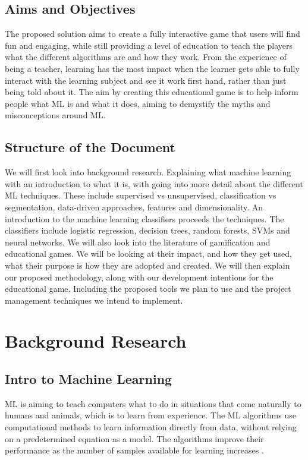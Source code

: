 \documentclass[a4paper,10pt]{article}
\begin{document}
\subsection{Aims and Objectives}
The proposed solution aims to create a fully interactive game that users will find fun and engaging, while still providing a level of education to teach the players what the different algorithms are and how they work. From the experience of being a teacher, learning has the most impact when the learner gets able to fully interact with the learning subject and see it work first hand, rather than just being told about it. The aim by creating this educational game is to help inform people what ML is and what it does, aiming to demystify the myths and misconceptions around ML.

\subsection{Structure of the Document}
We will first look into background research. Explaining what machine learning with an introduction to what it is, with going into more detail about the different ML techniques. These include supervised vs unsupervised, classification vs segmentation, data-driven approaches, features and dimensionality. An introduction to the machine learning classifiers proceeds the techniques. The classifiers include logistic regression, decision trees, random forests, SVMs and neural networks. We will also look into the literature of gamification and educational games. We will be looking at their impact, and how they get used, what their purpose is how they are adopted and created. We will then explain our proposed methodology, along with our development intentions for the educational game. Including the proposed tools we plan to use and the project management techniques we intend to implement.

\section{Background Research}
\subsection{Intro to Machine Learning}
ML is aiming to teach computers what to do in situations that come naturally to humans and animals, which is to learn from experience. The ML algorithms use computational methods to learn information directly from data, without relying on a predetermined equation as a model. The algorithms improve their performance as the number of samples available for learning increases \cite{matlanintrotoml}.
\end{document}

